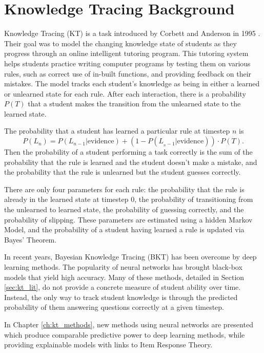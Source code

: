 \chapter{Knowledge Tracing Background}

Knowledge Tracing (KT) is a task introduced by Corbett and Anderson in 1995 \cite{corbett1995}. Their goal was to model the changing knowledge state of students as they progress through an online intelligent tutoring program. This tutoring system helps students practice writing computer programs by testing them on various rules, such as correct use of in-built functions, and providing feedback on their mistakes. The model tracks each student's knowledge as being in either a learned or unlearned state for each rule. After each interaction, there is a probability $P(T)$ that a student makes the transition from the unlearned state to the learned state.

The probability that a student has learned a particular rule at timestep $n$ is
\begin{equation}
P(L_n) = P(L_{n-1} | \text{evidence}) + (1 - P(L_{_n-1} | \text{evidence})) \cdot P(T).
\label{eq:kt}
\end{equation}
Then the probability of a student performing a task correctly is the sum of the probability that the rule is learned and the student doesn't make a mistake, and the probability that the rule is unlearned but the student guesses correctly.

There are only four parameters for each rule: the probability that the rule is already in the learned state at timestep 0, the probability of transitioning from the unlearned to learned state, the probability of guessing correctly, and the probability of slipping. These parameters are estimated using a hidden Markov Model, and the probability of a student having learned a rule is updated via Bayes' Theorem.

In recent years, Bayesian Knowledge Tracing (BKT) has been overcome by deep learning methods. The popularity of neural networks has brought black-box models that yield high accuracy. Many of these methods, detailed in Section \ref{sec:kt_lit}, do not provide a concrete measure of student ability over time. Instead, the only way to track student knowledge is through the predicted probability of them answering questions correctly at a given timestep. 

In Chapter \ref{ch:kt_methods}, new methods using neural networks are presented which produce comparable predictive power to deep learning methods, while providing explainable models with links to Item Response Theory.


